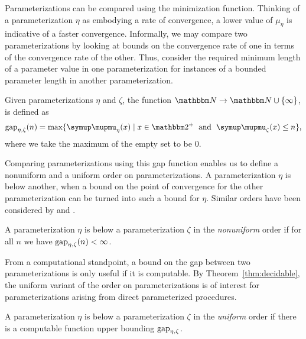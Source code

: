 Parameterizations can be compared using the minimization function.
Thinking of a parameterization $\eta$ as embodying a rate of convergence, a lower value of $\mu_\eta$ is indicative of a faster convergence.
Informally, we may compare two parameterizations by looking at bounds on the convergence rate of one in terms of the convergence rate of the other.
Thus, consider the required minimum length of a parameter value in one parameterization for instances of a bounded parameter length in another parameterization.
\begin{definition}
  Given parameterizations $\eta$ and $\zeta$, the  function $\bbN \to \bbN \cup \{\infty\}$, is defined as
  \begin{equation*}
    \gap_{\eta, \zeta}(n) \deq \max\{\mu_{\eta}(x) \st x \in \binary^+ \reland \mu_{\zeta}(x) \le n\},
  \end{equation*}
  where we take the maximum of the empty set to be $0$.
\end{definition}

Comparing parameterizations using this gap function enables us to define a nonuniform and a uniform order on parameterizations.
A parameterization $\eta$ is below another, when a bound on the point of convergence for the other parameterization can be turned into such a bound for $\eta$.
Similar orders have been considered by \textcite{komusiewicz2012new} and \textcite{fellows2013towards}.

\begin{definition}
  A parameterization $\eta$ is below a parameterization $\zeta$ in the \emph{nonuniform} order  if for all $n$ we have $\operatorname{gap}_{\eta, \zeta}(n) < \infty$.
\end{definition}

From a computational standpoint, a bound on the gap between two parameterizations is only useful if it is computable.
By Theorem~\ref{thm:decidable}, the uniform variant of the order on parameterizations is of interest for parameterizations arising from direct parameterized procedures.

\begin{definition}
\label{def:uniform_order}%
  A parameterization $\eta$ is below a parameterization $\zeta$ in the \emph{uniform} order  if there is a computable function upper bounding $\operatorname{gap}_{\eta, \zeta}$.
\end{definition}

